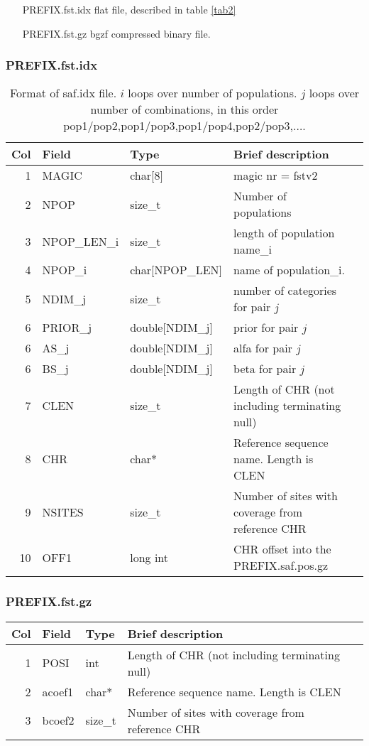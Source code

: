 \documentclass[10pt]{article}
\begin{document}
\begin{itemize}
\item[PREFIX.fst.idx] flat file, described in table \ref{tab2}
\item[PREFIX.fst.gz] bgzf compressed binary file.
\end{itemize}
\subsubsection{PREFIX.fst.idx}
\begin{table}[h]
\begin{tabular}{rllll}
  \hline
  {\bf Col} & {\bf Field} & {\bf Type} & {\bf Brief description} \\
  \hline
  1 & {\sf MAGIC} & char[8] &  magic nr = fstv2\\
  2 & {\sf NPOP} & size\_t &  Number of populations\\
  \hline \hline
  3 & {\sf NPOP\_LEN\_i} & size\_t &  length of population name\_i\\
  4 & {\sf NPOP\_i} & char[NPOP\_LEN] &  name of population\_i.\\
  \hline\hline
  5 & {\sf NDIM\_j} & size\_t & number of categories for pair $j$   \\
  6 & {\sf PRIOR\_j} & double[NDIM\_j] &  prior for pair $j$\\
  \hline\hline
  6 & {\sf AS\_j} & double[NDIM\_j] &  alfa for pair $j$\\
  6 & {\sf BS\_j} & double[NDIM\_j] &  beta for pair $j$\\
  \hline\hline
  7 & {\sf CLEN} & size\_t &  Length of CHR (not including terminating null)\\
  8 & {\sf CHR} & char* & Reference sequence name. Length is CLEN\\
  9 & {\sf NSITES} & size\_t & Number of sites with coverage from reference CHR\\
  10 & {\sf OFF1} & long int & CHR offset into the PREFIX.saf.pos.gz \\
  \hline
\end{tabular}\label{tab4}
\caption{Format of saf.idx file. $i$ loops over number of populations. $j$ loops over number of combinations, in this order pop1/pop2,pop1/pop3,pop1/pop4,pop2/pop3,$\ldots$.}
\end{table}
\subsubsection{PREFIX.fst.gz}
\begin{table}[h]
\begin{tabular}{rllll}
  \hline
  {\bf Col} & {\bf Field} & {\bf Type} & {\bf Brief description} \\
  \hline
  1 & {\sf POSI} & int &  Length of CHR (not including terminating null)\\
  2 & {\sf acoef1} & char* & Reference sequence name. Length is CLEN\\
  3 & {\sf bcoef2} & size\_t & Number of sites with coverage from reference CHR\\
  \hline
\end{tabular}\label{tab5}
\end{table}
\end{document}
